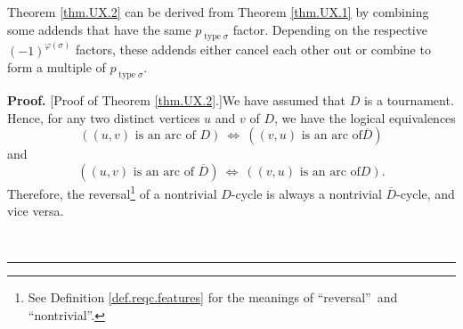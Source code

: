 \documentclass[numbers=enddot,12pt,final,onecolumn,notitlepage]{scrartcl}%
\numberwithin{exer}{section}
\theoremstyle{definition}
\newenvironment{proof}[1][Proof]{\noindent\textbf{#1.} }{\ \rule{0.5em}{0.5em}}
\begin{document}
Theorem \ref{thm.UX.2} can be derived from Theorem \ref{thm.UX.1} by combining
some addends that have the same $p_{\operatorname*{type}\sigma}$ factor.
Depending on the respective $\left(  -1\right)  ^{\varphi\left(
\sigma\right)  }$ factors, these addends either cancel each other out or
combine to form a multiple of $p_{\operatorname*{type}\sigma}$.

\begin{proof}
[Proof of Theorem \ref{thm.UX.2}.]We have assumed that $D$ is a tournament.
Hence, for any two distinct vertices $u$ and $v$ of $D$, we have the logical
equivalences%
\[
\left(  \left(  u,v\right)  \text{ is an arc of }D\right)
\ \Longleftrightarrow\ \left(  \left(  v,u\right)  \text{ is an arc of
}\overline{D}\right)
\]
and%
\[
\left(  \left(  u,v\right)  \text{ is an arc of }\overline{D}\right)
\ \Longleftrightarrow\ \left(  \left(  v,u\right)  \text{ is an arc of
}D\right)  .
\]
Therefore, the reversal\footnote{See Definition \ref{def.reqc.features} for
the meanings of \textquotedblleft reversal\textquotedblright\ and
\textquotedblleft nontrivial\textquotedblright.} of a nontrivial $D$-cycle is
always a nontrivial $\overline{D}$-cycle, and vice versa.


\end{proof}
\end{document}
